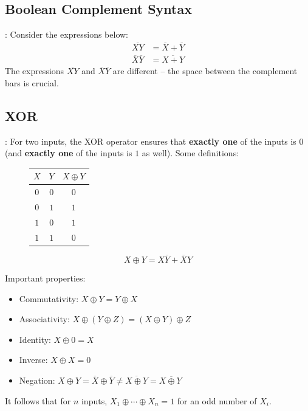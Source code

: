 \documentclass{../slides}
\begin{document}
\subsection{Boolean Complement Syntax}
\begin{frame}{\secname: \subsecname}
    Consider the expressions below:
    \begin{align*}
        \overbar{XY} &= \overbar{X} + \overbar{Y}\\
        \overbar{X}\overbar{Y} &= \overbar{X + Y}
    \end{align*}
    The expressions $\overbar{XY}$ and $\overbar{X}\overbar{Y}$ are different -- the space between the complement bars is crucial.\\
\end{frame}

\subsection{XOR}
\begin{frame}{\secname: \subsecname}
    For two inputs, the XOR operator ensures that \textbf{exactly one} of the inputs is $0$ (and \textbf{exactly one} of the inputs is $1$ as well). Some definitions:
    \begin{multicols}{2}
    \begin{figure}[H]
        \centering
        \begin{table}[H]
        \begin{tabular}{|c|c|c|}
        \hline
        $X$ & $Y$ & $X\oplus Y$ \\ \hline\hline
        $0$ & $0$ & $0$ \\ \hline
        $0$ & $1$ & $1$ \\ \hline
        $1$ & $0$ & $1$ \\ \hline
        $1$ & $1$ & $0$ \\ \hline
        \end{tabular}
        \end{table}
    \end{figure}
    $$X\oplus Y = X\overbar{Y} + \overbar{X}Y$$
    \end{multicols}
    Important properties:
    \begin{itemize}
        \item Commutativity: $X\oplus Y = Y\oplus X$
        \item Associativity: $X\oplus (Y\oplus Z) = (X\oplus Y) \oplus Z$
        \item Identity: $X\oplus 0 = X$
        \item Inverse: $X\oplus X = 0$
        \item Negation: $X\oplus Y = \overbar{X} \oplus \overbar{Y} \neq \overbar{X\oplus Y} = X\overbar{\oplus}Y$
    \end{itemize}
    It follows that for $n$ inputs, $X_1\oplus \cdots \oplus X_n = 1$ for an odd number of $X_i$.
\end{frame}
\end{document}
